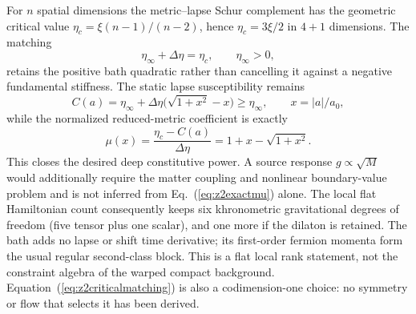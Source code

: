 \documentclass[10pt]{article}
\begin{document}
For $n$ spatial dimensions the metric--lapse Schur complement has the geometric
critical value $\eta_c=\xi(n-1)/(n-2)$, hence $\eta_c=3\xi/2$ in $4+1$
dimensions.  The matching
\begin{equation}
 \eta_\infty+\Delta\eta=\eta_c,
 \qquad \eta_\infty>0,
 \label{eq:z2criticalmatching}
\end{equation}
retains the positive bath quadratic rather than cancelling it against a
negative fundamental stiffness.  The static lapse susceptibility remains
\begin{equation}
 C(a)=\eta_\infty+\Delta\eta
 \bigl(\sqrt{1+x^2}-x\bigr)\geq\eta_\infty,
 \qquad x=|a|/a_0,
 \label{eq:z2susceptibility}
\end{equation}
while the normalized reduced-metric coefficient is exactly
\begin{equation}
 \mu(x)=\frac{\eta_c-C(a)}{\Delta\eta}
       =1+x-\sqrt{1+x^2}.
 \label{eq:z2exactmu}
\end{equation}
This closes the desired deep constitutive power.  A source response
$g\propto\sqrt M$ would additionally require the matter coupling and nonlinear
boundary-value problem and is not inferred from Eq.~(\ref{eq:z2exactmu}) alone.
The local flat Hamiltonian count consequently keeps six khronometric
gravitational degrees of freedom (five tensor plus one scalar), and one more if
the dilaton is retained.  The bath adds no lapse or shift time derivative; its
first-order fermion momenta form the usual regular second-class block.  This is
a flat local rank statement, not the constraint algebra of the warped compact
background.  Equation~(\ref{eq:z2criticalmatching}) is also a codimension-one
choice: no symmetry or flow that selects it has been derived.
\end{document}
